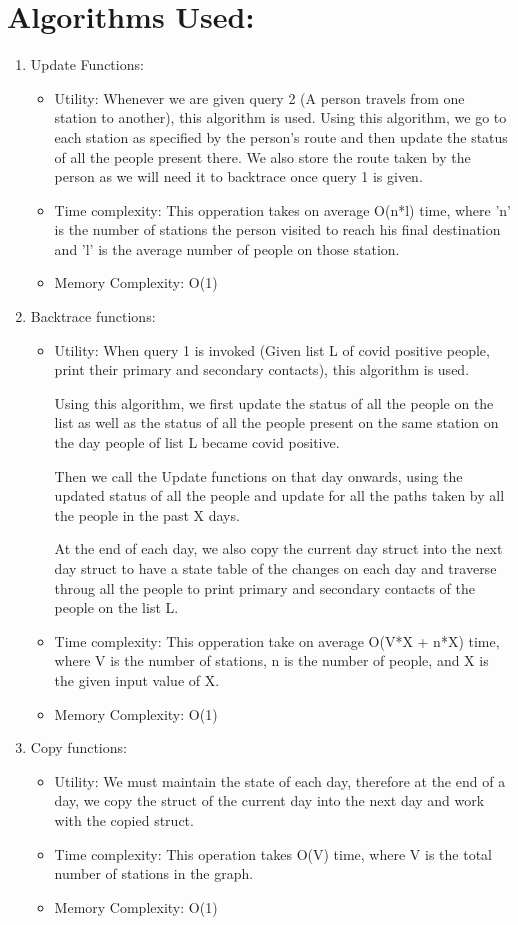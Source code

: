 \documentclass{article}
\begin{document}
\newpage
\section{Algorithms Used:}
\begin{enumerate}
    \item Update Functions: {\begin{itemize}
        \item Utility:
		Whenever we are given query 2 (A person travels from one station to another), this algorithm is used.
		Using this algorithm, we go to each station as specified by the person's route and then update the status of all the people present there.
		We also store the route taken by the person as we will need it to backtrace once query 1 is given.
		\item Time complexity:
		This opperation takes on average O(n*l) time, where 'n' is the number of stations the person visited to reach his final destination and 'l' is the average number of people on those station.
		\item Memory Complexity: O(1)
    \end{itemize}
	}
	\item Backtrace functions: {\begin{itemize}
        \item Utility:
		When query 1 is invoked (Given list L of covid positive people, print their primary and secondary contacts), this algorithm is used.
		
		Using this algorithm, we first update the status of all the people on the list as well as the status of all the people present on the same station on the day people of list L became covid positive.
		
		Then we call the Update functions on that day onwards, using the updated status of all the people and update for all the paths taken by all the people in the past X days.
		
		At the end of each day, we also copy the current day struct into the next day struct to have a state table of the changes on each day and traverse throug all the people to print primary and secondary contacts of the people on the list L.
		\item Time complexity:
		This opperation take on average O(V*X + n*X) time, where V is the number of stations, n is the number of people, and X is the given input value of X.
		\item Memory Complexity: O(1)
    \end{itemize}
	}
	\item Copy functions: 
	{\begin{itemize}
        \item Utility: We must maintain the state of each day, therefore at the end of a day, we copy the struct of the current day into the next day and work with the copied struct.
		\item Time complexity: This operation takes O(V) time, where V is the total number of stations in the graph.
	    \item Memory Complexity: O(1)
    \end{itemize}
	}
\end{enumerate}
\newpage
\end{document}
